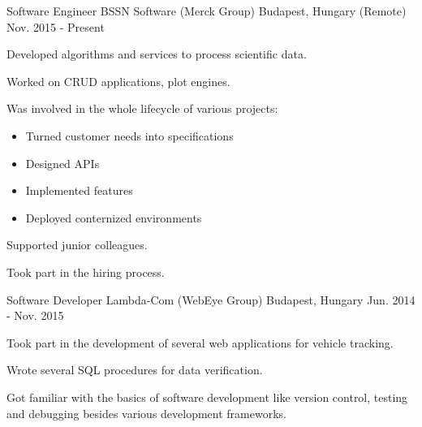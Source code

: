 

\begin{cventries}

  \cventry
    {Software Engineer} %
    {BSSN Software (Merck Group)} %
    {Budapest, Hungary (Remote)} %
    {Nov. 2015 - Present} %
    {
      \begin{cvitems} %
        \item {Developed algorithms and services to process scientific data.}
		\item {Worked on CRUD applications, plot engines.}
        \item {Was involved in the whole lifecycle of various projects:
		 \begin{itemize} %
		  \item {Turned customer needs into specifications}
		  \item {Designed APIs}
          \item {Implemented features}
          \item {Deployed conternized environments}
		 \end{itemize}}
		\item {Supported junior colleagues.}
		\item {Took part in the hiring process.}
      \end{cvitems}
    }

  \cventry
    {Software Developer} %
    {Lambda-Com (WebEye Group)} %
    {Budapest, Hungary} %
    {Jun. 2014 - Nov. 2015} %
    {
      \begin{cvitems} %
        \item {Took part in the development of several web applications for vehicle tracking.}
		\item {Wrote several SQL procedures for data verification.}
        \item {Got familiar with the basics of software development like version control, testing and debugging besides various development frameworks.}
      \end{cvitems}
    }

\end{cventries}
